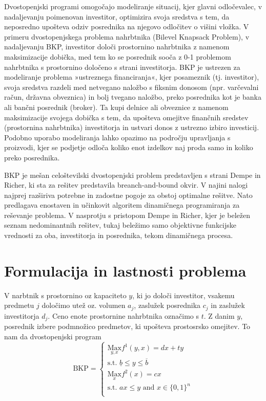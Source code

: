\documentclass[a4paper, 11pt]{article}
\begin{document}
	Dvostopenjski programi omogočajo modeliranje situacij, kjer glavni odločevalec, v nadaljevanju poimenovan investitor, optimizira svoja sredstva s tem, da neposredno upošteva odziv posrednika na njegovo odločitev o višini vložka. V primeru dvostopenjskega problema nahrbtnika (Bilevel Knapsack Problem), v nadaljevanju BKP, investitor določi prostornino nahrbtnika z namenom maksimizacije dobička, med tem ko se posrednik sooča z 0-1 problemom nahrbtnika s prostornino določeno s strani investitorja. BKP je ustrezen za modeliranje problema »ustreznega financiranja«, kjer posameznik (tj. investitor), svoja sredstva razdeli med netvegano naložbo s fiksnim donosom (npr. varčevalni račun, državna obveznica) in bolj tvegano naložbo, preko posrednika kot je banka ali bančni posrednik (broker). Ta kupi delnice ali obveznice z namenom maksimizacije svojega dobička s tem, da upošteva omejitve finančnih sredstev (prostornina nahrbtnika) investitorja in ustvari donos z ustrezno izbiro investicij. Podobno uporabo modeliranja lahko opazimo na področju upravljanja s proizvodi, kjer se podjetje odloča koliko enot izdelkov naj proda samo in koliko preko posrednika.
	
	BKP je mešan celoštevilski dvostopenjski problem predstavljen s strani Dempe in Richer, ki sta za rešitev predstavila breanch-and-bound okvir. V najini nalogi najprej razširiva potrebne in zadostne pogoje za obstoj optimalne rešitve. Nato predlagava enostaven in učinkovit algoritem dinamičnega programiranja za reševanje problema. V nasprotju s pristopom Dempe in Richer, kjer je beležen seznam nedominantnih rešitev, tukaj beležimo samo objektivne funkcijske vrednosti za oba, investitorja in posrednika, tekom dinamičnega procesa.
		
	\section{Formulacija in lastnosti problema}
	
	V narbtnik s prostornino oz kapaciteto $y$, ki jo določi investitor, vsakemu predmetu $j$ določimo utež oz. volumen $a_j$, zaslužek posrednika $c_j$ in zaslužek investitorja $d_j$. Ceno enote prostornine nahrbtnika označimo s $t$. Z danim $y$, posrednik izbere podmnožico predmetov, ki upošteva prostosrsko omejitev. To nam da dvostopenjski program
	\[   
	\text{BKP} = 
    	\begin{cases}
	 	\text{$\underset{y,x}{\text{Max}} f^{1}(y,x)=dx+ty$} \\
       		\text{s.t. $\underline{b} \leq y \leq \overline{b}$} \\
       		\text{$\underset{x}{\text{Max}} f^{2}(x)=cx$} \\
       		\text{s.t. $ax \leq y$ and $x \in \{ 0, 1\}^n$} \\ 
    	\end{cases}
	\]
\end{document}
